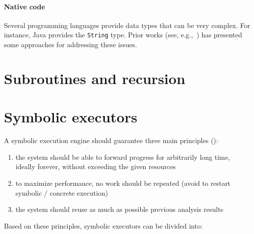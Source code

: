 \paragraph{Native code} Several programming languages provide data types that can be very complex. For instance, Java provides the {\tt String} type. Prior works (see, e.g.,~\cite{SHZ-TAIC07}) has presented some approaches for addressing these issues.


\section{Subroutines and recursion}
\label{se:recursion}









\section{Symbolic executors}

A symbolic execution engine should guarantee three main principles (\cite{MAYHEM-SP12}):
\begin{enumerate}
  \item the system should be able to forward progress for arbitrarily long time, ideally forever, without exceeding the given resources
  \item to maximize performance, no work should be repeated (avoid to restart symbolic / concrete execution)
  \item the system should reuse as much as possible previous analysis results
\end{enumerate}

Based on these principles, symbolic executors can be divided into:

